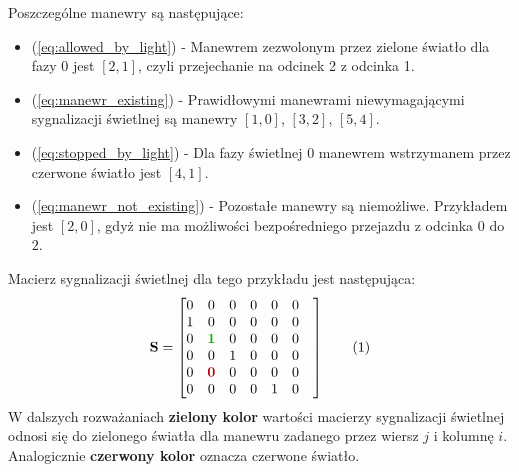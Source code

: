\documentclass[12pt]{book}
\theoremstyle{plain}
\newcommand\addtag{\refstepcounter{equation}
\renewcommand{\labelenumii}{\theenumii}
\renewcommand{\theenumii}{\theenumi.\arabic{enumii}.}
\tag{\theequation}}
\newcommand{\myref}[1]{(\ref{#1})}
\begin{document}
Poszczególne manewry są następujące:
\begin{itemize}
	\item \myref{eq:allowed_by_light} - Manewrem zezwolonym przez zielone światło  dla fazy $ 0 $ jest $ [2,1] $, czyli przejechanie na odcinek 2 z odcinka 1.
	\item \myref{eq:manewr_existing} - Prawidłowymi manewrami niewymagającymi sygnalizacji świetlnej są manewry $ [1,0] $, $ [3,2] $, $ [5,4] $.
	\item \myref{eq:stopped_by_light} - Dla fazy świetlnej $ 0 $ manewrem wstrzymanem przez czerwone światło jest $ [4,1] $.
	\item \myref{eq:manewr_not_existing} - Pozostałe manewry są niemożliwe. Przykładem jest $ [2,0] $, gdyż nie ma możliwości bezpośredniego przejazdu z odcinka $ 0 $ do $ 2 $.
\end{itemize}

Macierz sygnalizacji świetlnej dla tego przykładu jest następująca:
\def \S{\begin{bmatrix}
		0 & 0 & 0 & 0 & 0 & 0 \\
		1 & 0 & 0 & 0 & 0 & 0 \\
		0 & 0 & 0 & 0 & 0 & 0 \\
		0 & 0 & 1 & 0 & 0 & 0 \\
		0 & 0 & 0 & 0 & 0 & 0 \\
		0 & 0 & 0 & 0 & 1 & 0 \\
\end{bmatrix}}
\def \S_zero_one{
	\begin{bmatrix}
		0 & 0            & 0 & 0 & 0 & 0 \\
		1 & 0            & 0 & 0 & 0 & 0 \\
		0 & {\color[rgb]{0,.70,0} \textbf{1}}  & 0 & 0 & 0 & 0 \\
		0 & 0            & 1 & 0 & 0 & 0 & \\
		0 & {\color[rgb]{.70,0,0} \textbf{0}}  & 0 & 0 & 0 & 0 \\
		0 & 0            & 0 & 0 & 1 & 0 \\
	\end{bmatrix}
}
\[\textbf{S}= \S_zero_one \addtag \]
W dalszych rozważaniach {\color[rgb]{0,.70,0} \textbf{zielony kolor}} wartości macierzy sygnalizacji świetlnej odnosi się do zielonego światła dla manewru zadanego przez wiersz $j$ i kolumnę $i$. Analogicznie 
{\color[rgb]{.70,0,0} \textbf{czerwony kolor}} oznacza czerwone światło.
\end{document}
